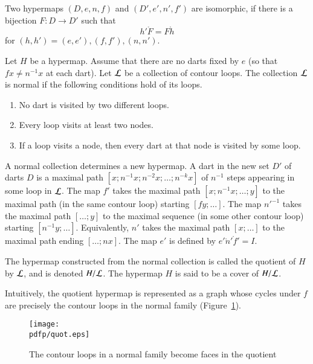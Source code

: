 \begin{definition}[isomorphic] Two hypermaps $(D,e,n,f)$ and $(D',e',n',f')$ are
isomorphic, if there is a bijection $F:D\to D'$ such that
    $$h'\ocirc F = F\ocirc h$$
for $(h,h')=(e,e'), (f,f'), (n,n')$.
\end{definition}


\begin{definition}
Let $H$ be a hypermap. Assume that 
there are no darts fixed by $e$ 
(so that $f x \ne n^{-1} x$ at each dart). 
Let $\cal L$ be a collection of contour
loops.  The collection $\cal L$ is  normal if the following
conditions hold of its loops. \begin{enumerate}
 \item No dart is visited by two different loops.
 \item Every loop visits at least two nodes.
 \item If a loop visits a node, then every dart at that node is visited by some loop.
\end{enumerate}
\end{definition}

A normal collection determines a new hypermap.   A dart in the new set $D'$ of darts $D$ is a maximal path $[x;n^{-1} x; n^{-2} x;\ldots;n^{-k} x]$  of $n^{-1}$ steps appearing in some loop in $\cal L$. The map $f'$ takes the maximal path $[x;n^{-1}x;\ldots;y]$ to the maximal path (in the same contour loop) starting $[f y;\ldots]$. The map ${n'}^{-1}$ takes the maximal path  $[\ldots;y]$ to the maximal sequence (in some other contour loop) starting $[n^{-1}y;\ldots]$. Equivalently, $n'$ takes the maximal path $[x;\ldots]$ to the maximal path ending $[\ldots;n x]$. The map $e'$ is defined by $e'\ocirc n'\ocirc f' = I$.  

\begin{definition}[quotient]  The hypermap constructed from the normal collection is called the quotient of $H$ by $\cal L$, and is denoted $H/{\cal L}$.  The hypermap $H$ is said to be a cover of $H/{\cal L}$.
\end{definition}

Intuitively, the quotient hypermap is represented as a graph whose cycles under $f$ are precisely the contour loops in the normal family (Figure~\ref{fig:quot}).


\begin{figure}[htb]
  \centering
  \texttt{[image: \\pdfp/quot.eps]}
  \caption{The contour loops in a normal family become faces in the quotient}
  \label{fig:quot}
\end{figure}


